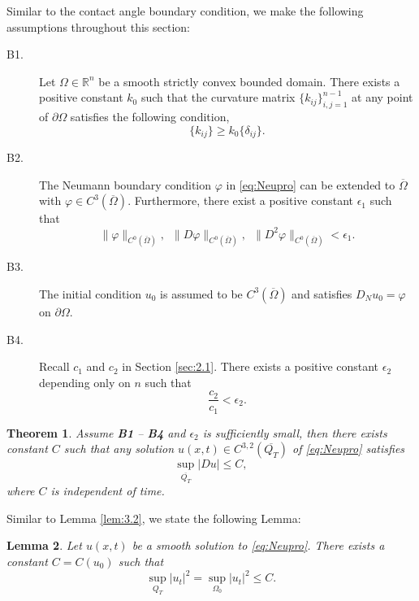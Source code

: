 \documentclass[12pt]{article}
\numberwithin{equation}{section}
\theoremstyle{plain}
\newtheorem{theorem}{Theorem}[section]
\newtheorem{lemma}[theorem]{Lemma}
\theoremstyle{definition}
\theoremstyle{remark}
\begin{document}
 Similar to the contact angle boundary condition, we make the following assumptions throughout this section:

\begin{description}
\item[B1.] 
Let $\Omega\in \mathbb{R}^n$ be a smooth strictly convex bounded domain. There exists a positive constant $k_0$ such that the curvature matrix $\{ k_{ij} \}_{i,j=1}^{n-1}$ at any point of $\partial\Omega$ satisfies the following condition,
\begin{equation*}
    \{ k_{ij} \} \geq k_0 \{ \delta_{ij} \}.
\end{equation*}
\item[B2.]
The Neumann boundary condition $\varphi$ in \eqref{eq:Neupro} can be extended to $\overline{\Omega}$ with $\varphi \in C^3 (\overline{\Omega})$. Furthermore, there exist a positive constant $\epsilon_1$ such that 
\begin{equation} \label{eq:neu_condA2}
    \|\varphi\|_{C^0(\overline{\Omega})},\,\,\,
    \|D\varphi\|_{C^0(\overline{\Omega})},\,\,\,
    \|D^2\varphi\|_{C^0(\overline{\Omega})} <\epsilon_1.
\end{equation} 

\item[B3.] The initial condition $u_0$ is assumed to be $C^3(\overline{\Omega})$ and satisfies $D_N u_0 = \varphi $ on $\partial \Omega$.

\item[B4.] Recall $c_1$ and $c_2$ in Section \ref{sec:2.1}. There exists a positive constant $\epsilon_2$ depending only on $n$ such that
\begin{equation} \label{eq:neu_condA4}
    \frac{c_2}{c_1} < \epsilon_2.
\end{equation}
\end{description}

\begin{theorem} \label{thm:4.1}
Assume {\bf B1} -- {\bf B4} and 
 $\epsilon_2$ is sufficiently small, then
there exists constant $C$ such that any solution $u(x,t) \in C^{3,2} (\overline{Q_T})$ of \eqref{eq:Neupro}
satisfies
\begin{equation}\label{eq:neugradest}
    \sup_{\overline{Q_T}} |Du| \leq C,
\end{equation}
where $C$ is independent of time.
\end{theorem}
Similar to Lemma \ref{lem:3.2}, we state the following Lemma:
\begin{lemma}\label{lem:4.2}
Let $u(x,t)$ be a smooth solution to \eqref{eq:Neupro}. There exists a constant 
$C=C(u_0)$ such that 
\begin{equation*}
    \sup_{Q_T} |u_t|^2=\sup_{\Omega_0} |u_t|^2 \leq C.
\end{equation*}

\end{lemma} 
\end{document}
